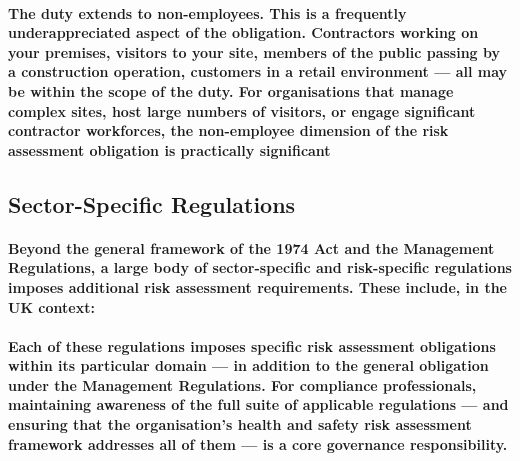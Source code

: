 \paragraph{\textbf{The duty extends to non-employees}. This is a frequently underappreciated aspect of the obligation. Contractors working on your premises, visitors to your site, members of the public passing by a construction operation, customers in a retail environment — all may be within the scope of the duty. For organisations that manage complex sites, host large numbers of visitors, or engage significant contractor workforces, the non-employee dimension of the risk assessment obligation is practically significant}

\subsection{Sector-Specific Regulations}
\paragraph{Beyond the general framework of the 1974 Act and the Management Regulations, a large body of sector-specific and risk-specific regulations imposes additional risk assessment requirements. These include, in the UK context:}
\begin{itemize}
\end{itemize}
\paragraph{Each of these regulations imposes specific risk assessment obligations within its particular domain — in addition to the general obligation under the Management Regulations. For compliance professionals, maintaining awareness of the full suite of applicable regulations — and ensuring that the organisation's health and safety risk assessment framework addresses all of them — is a core governance responsibility.}

